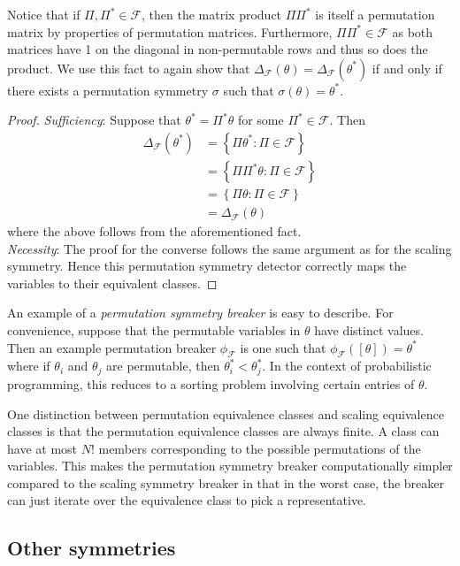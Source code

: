 Notice that if $\Pi,\Pi^*\in\mathcal{F}$, then the matrix product $\Pi\Pi^*$ is itself a permutation matrix by properties of permutation matrices. Furthermore, $\Pi\Pi^*\in\mathcal{F}$ as both matrices have 1 on the diagonal in non-permutable rows and thus so does the product. We use this fact to again show that $\Delta_\mathcal{F}(\theta)=\Delta_\mathcal{F}(\theta^*)$ if and only if there exists a permutation symmetry $\sigma$ such that $\sigma(\theta)=\theta^*$.

\begin{proof}
\textit{Sufficiency}: Suppose that $\theta^*=\Pi^*\theta$ for some $\Pi^*\in\mathcal{F}$. Then
\begin{align*}
\Delta_\mathcal{F}(\theta^*) &= \left\{\Pi\theta^*:\Pi\in\mathcal{F}\right\} \\
&= \left\{\Pi\Pi^*\theta:\Pi\in\mathcal{F}\right\} \\
&= \left\{\Pi\theta:\Pi\in\mathcal{F}\right\} \\
&= \Delta_\mathcal{F}(\theta)
\end{align*}
where the above follows from the aforementioned fact.
\\

\noindent \textit{Necessity}: The proof for the converse follows the same argument as for the scaling symmetry. Hence this permutation symmetry detector correctly maps the variables to their equivalent classes.
\end{proof}

An example of a \textit{permutation symmetry breaker} is easy to describe. For convenience, suppose that the permutable variables in $\theta$ have distinct values. Then an example permutation breaker $\phi_\mathcal{F}$ is one such that $\phi_\mathcal{F}([\theta])=\theta^*$ where if $\theta_i$ and $\theta_j$ are permutable, then $\theta^*_i<\theta^*_j$. In the context of probabilistic programming, this reduces to a sorting problem involving certain entries of $\theta$.

One distinction between permutation equivalence classes and scaling equivalence classes is that the permutation equivalence classes are always finite. A class can have at most $N!$ members corresponding to the possible permutations of the variables. This makes the permutation symmetry breaker computationally simpler compared to the scaling symmetry breaker in that in the worst case, the breaker can just iterate over the equivalence class to pick a representative.


\subsection{Other symmetries}

